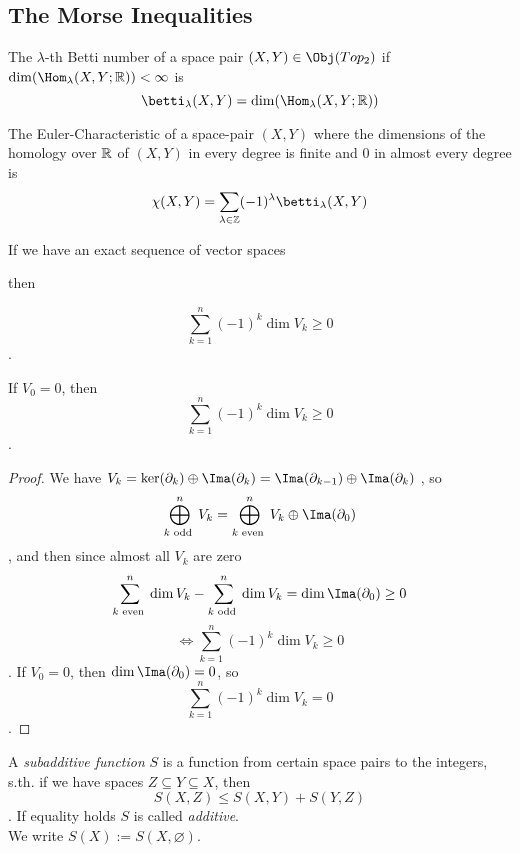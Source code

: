 \subsection{The Morse Inequalities}

\begin{definition}
   The $\lambda$-th Betti number of a space pair 
   $(X, Y) \in \Obj(Top_2)$ if $\dim(\Hom_{\lambda}(X, Y; \R)) < \infty$ is
   \[ \betti_{\lambda}(X, Y) = \dim(\Hom_{\lambda}(X, Y; \R)) \]

   The Euler-Characteristic of a space-pair $(X, Y)$ where the dimensions of the
   homology over ${\mathbb R}$ of $(X, Y)$ in every degree is finite and $0$ in almost 
   every degree is
   \[ \chi (X, Y) = \sum_{\lambda \in \Z} (-1)^{\lambda}\betti_{\lambda}(X, Y) \]
\end{definition}

\begin{lemma}
   \label{lemma:alternating sum}
   If we have an exact sequence of vector spaces

   \begin{figure}[H]
      \centering
   \end{figure}

   then 

   \[ \sum_{k = 1}^n (-1)^k \dim V_k \geq 0 \].

   If $V_0 = 0$, then
   \[ \sum_{k = 1}^n (-1)^k \dim V_k \geq 0 \].
\end{lemma}

\begin{proof}
   We have $V_k = \ker(\del_k) \oplus \Ima(\del_k) = \Ima(\del_{k - 1}) \oplus \Ima(\del_k)$
   , so 
   \[ \bigoplus_{k \text{ odd }}^n V_k = \bigoplus_{k \text{ even }}^n V_k \oplus \Ima (\del_0) \]
   , and then since almost all $V_k$ are zero
   \[ \sum_{k \text{ even }}^n \dim V_k - \sum_{k \text{ odd }}^n \dim V_k = \dim \Ima(\del_0) \geq 0\]
   \[ \Leftrightarrow \sum_{k = 1}^n (-1)^k \dim V_k \geq 0 \].
   If $V_0 = 0$, then $\dim \Ima(\del_0) = 0$, so
   \[ \sum_{k = 1}^n (-1)^k \dim V_k = 0 \].
\end{proof}

\begin{definition}
   A \textit{subadditive function} $S$ is a function from certain space pairs to
   the integers, s.th. if we have spaces $Z \subseteq Y \subseteq X$, then 
   \[ S(X, Z) \leq S(X, Y) + S(Y, Z) \].
   If equality holds $S$ is called \textit{additive}. \\
   We write $S(X) := S(X, \varnothing)$.
\end{definition}

